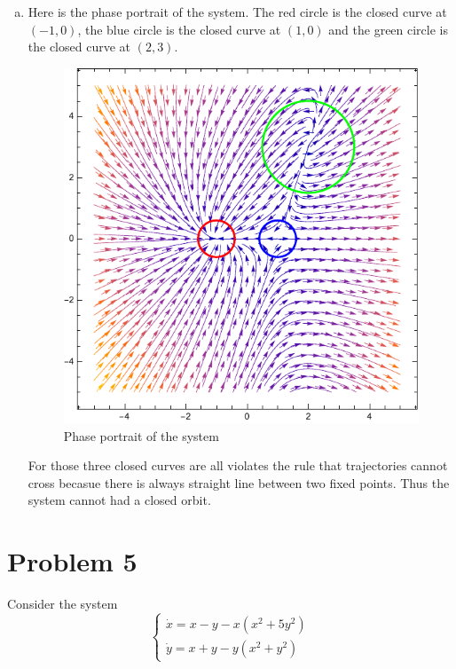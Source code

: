 \documentclass[12pt]{exam}
\begin{document}
\begin{enumerate}[(a)]
	\item Here is the phase portrait of the system. The red circle is the closed curve at $(-1, 0)$, the blue circle is the closed curve at $(1,0)$ and the green circle is the closed curve at $(2,3)$.
	\begin{figure}[H]
		\centering
		\includegraphics[width=0.6\linewidth]{4c.pdf}
		\caption{Phase portrait of the system}
		\label{fig:phase}
	\end{figure}
	For those three closed curves are all violates the rule that trajectories cannot cross becasue there is always straight line between two fixed points. Thus the system cannot had a closed orbit.
\end{enumerate}

\section*{Problem 5}
Consider the system 
\[ \begin{cases}
	\dot{x} = x - y -x(x^2+5y^2) \\
	\dot{y} = x +y - y(x^2+y^2)
\end{cases} \]
\end{document}
